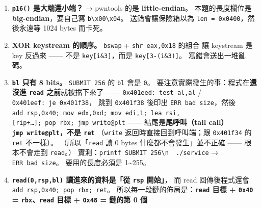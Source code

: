 \documentclass[10pt,a4paper]{article}
\providecommand{\tightlist}{%
  \setlength{\itemsep}{0pt}\setlength{\parskip}{0pt}}
\begin{document}
\begin{enumerate}
\def\labelenumi{\arabic{enumi}.}
\tightlist
\item
  \textbf{\texttt{p16()} 是大端還小端？} → pwntools 的是
  \textbf{little-endian}。 本題的長度欄位是
  \textbf{big-endian}，要自己寫
  \texttt{b\textquotesingle{}\allowbreak{}\textbackslash{}\allowbreak{}x00\textbackslash{}\allowbreak{}x04\textquotesingle{}\allowbreak{}}。
  送錯會讓保險箱以為 \texttt{len\ \allowbreak{}=\ \allowbreak{}0x0400}，然後永遠等 1024 bytes
  而卡死。
\item
  \textbf{XOR keystream 的順序。} \texttt{bswap} +
  \texttt{shr\ \allowbreak{}eax,\allowbreak{}0x18} 的組合 讓 keystream 是 key 反過來 ------ 不是
  \texttt{key{[}i\&\allowbreak{}3{]}}，而是 \texttt{key{[}3-(i\&\allowbreak{}3){]}}。
  寫錯會送出一堆亂碼。
\item
  \textbf{\texttt{bl} 只有 8 bits。} \texttt{SUBMIT\ \allowbreak{}256} 的 \texttt{bl}
  會是 \texttt{0}。 要注意實際發生的事：程式在\textbf{還沒進
  \texttt{read} 之前}就被擋下來了 ------ \texttt{0x401eed:\allowbreak{}\ \allowbreak{}test\ \allowbreak{}al,\allowbreak{}al}
  / \texttt{0x401eef:\allowbreak{}\ \allowbreak{}je\ \allowbreak{}0x401f38}， 跳到 \texttt{0x401f38} 後印出
  \texttt{ERR\ \allowbreak{}bad\ \allowbreak{}size}，然後
  \texttt{add\ \allowbreak{}rsp,\allowbreak{}0x40;\ \allowbreak{}mov\ \allowbreak{}edx,\allowbreak{}0xd;\ \allowbreak{}mov\ \allowbreak{}edi,\allowbreak{}1;\ \allowbreak{}lea\ \allowbreak{}rsi,{[}rip+…{]};\ \allowbreak{}pop\ \allowbreak{}rbx;\ \allowbreak{}jmp\ \allowbreak{}write@plt}
  ------ 結尾是\textbf{尾呼叫（tail call）\texttt{jmp\ \allowbreak{}write@plt}，不是
  \texttt{ret}} （\texttt{write} 返回時直接回到呼叫端；跟
  \texttt{0x401f34} 的 \texttt{ret} 不一樣）。 （所以「\texttt{read} 讀
  0 bytes 什麼都不會發生」並不正確 ------ 根本不會走到 \texttt{read}。）
  實測：\texttt{printf\ \allowbreak{}\textquotesingle{}\allowbreak{}SUBMIT\ \allowbreak{}256\textbackslash{}\allowbreak{}n\textquotesingle{}\allowbreak{}\ \allowbreak{}\textbar{}\allowbreak{}\ \allowbreak{}./\allowbreak{}service}
  → \texttt{ERR\ \allowbreak{}bad\ \allowbreak{}size}。 要用的長度必須是 1\textasciitilde255。
\item
  \textbf{\texttt{read(0,\allowbreak{}rsp,\allowbreak{}bl)} 讀進來的資料是「從 \texttt{rsp}
  開始」}， 而 read 回傳後程式還會
  \texttt{add\ \allowbreak{}rsp,\allowbreak{}0x40;\ \allowbreak{}pop\ \allowbreak{}rbx;\ \allowbreak{}ret}。
  所以每一段鏈的佈局是：\textbf{\texttt{read} 目標 + \texttt{0x40} =
  \texttt{rbx}、\texttt{read} 目標 + \texttt{0x48} = 鏈的第 0 個
}
\end{enumerate}
\end{document}
